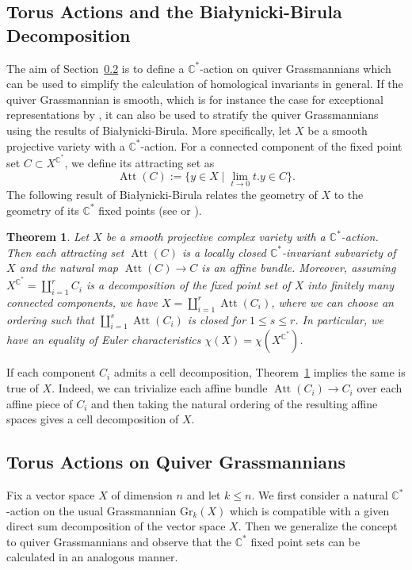 \documentclass{amsart}
\newtheorem{theorem}{Theorem}[section]
\numberwithin{equation}{section}
\newcommand{\C}{\mathbb{C}}
\newcommand{\CC}{\mathbb{C}}
\newcommand{\Att}{\operatorname{Att}}
\newcommand{\Gr}{\mathrm{Gr}}
\begin{document}
\subsection{Torus Actions and the Bia\l{}ynicki-Birula Decomposition}\label{sec:bb}
The aim of Section~\ref{torusaction} is to define a $\CC^*$-action on quiver Grassmannians which can be used to simplify the calculation of homological invariants in general.
If the quiver Grassmannian is smooth, which is for instance the case for exceptional representations by \cite{cr}, it can also be used to stratify the quiver Grassmannians using the results of Bia\l{}ynicki-Birula.
More specifically, let $X$ be a smooth projective variety with a $\C^\ast$-action.
For a connected component of the fixed point set $C\subset X^{\C^\ast}$, we define its attracting set as
\[\Att(C):=\{y\in X\mid \lim_{t\to 0}t.y\in C\}.\]
The following result of Bia\l{}ynicki-Birula relates the geometry of $X$ to the geometry of its $\CC^*$ fixed points (see \cite[Section 4]{bb} or \cite[Section 4]{ca}).
\begin{theorem}
  \label{thm:bb}
  Let $X$ be a smooth projective complex variety with a $\C^\ast$-action.
  Then each attracting set $\Att(C)$ is a locally closed $\CC^*$-invariant subvariety of $X$ and the natural map $\Att(C)\to C$ is an affine bundle.
  Moreover, assuming $X^{\C^\ast}=\coprod_{i=1}^r C_i$ is a decomposition of the fixed point set of $X$ into finitely many connected components, we have $X=\coprod_{i=1}^r \Att(C_i)$, where we can choose an ordering such that $\coprod_{i=1}^s\Att(C_i)$ is closed for $1\leq s\leq r$.
  In particular, we have an equality of Euler characteristics $\chi(X)=\chi(X^{\C^\ast})$.
\end{theorem}

If each component $C_i$ admits a cell decomposition, Theorem~\ref{thm:bb} implies the same is true of $X$.
Indeed, we can trivialize each affine bundle $\Att(C_i)\to C_i$ over each affine piece of $C_i$ and then taking the natural ordering of the resulting affine spaces gives a cell decomposition of $X$.


\subsection{Torus Actions on Quiver Grassmannians}
\label{torusaction}
Fix a vector space $X$ of dimension $n$ and let $k\leq n$.
We first consider a natural $\CC^*$-action on the usual Grassmannian $\Gr_k(X)$ which is compatible with a given direct sum decomposition of the vector space $X$.
Then we generalize the concept to quiver Grassmannians and observe that the $\CC^*$ fixed point sets can be calculated in an analogous manner.
\end{document}
